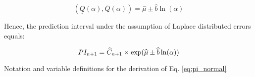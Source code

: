 \begin{equation}
(\underline{Q}(\alpha), \overline{Q}(\alpha)) = \widehat{\mu} \pm \widehat{b} \ln(\alpha)
\end{equation}

Hence, the prediction interval under the assumption of Laplace distributed errors equals:

\begin{equation}\label{eq:pi_laplace}
PI_{n+1} = \widehat{C}_{n+1} \times \exp( \widehat{\mu} \pm \widehat{b} \ln(\alpha) ) \\
\end{equation}

\begin{table}[t]
\centering

\caption{Notation and variable definitions for the derivation of Eq. \ref{eq:pi_normal}}\label{tab:PI_notation}
\end{table}
